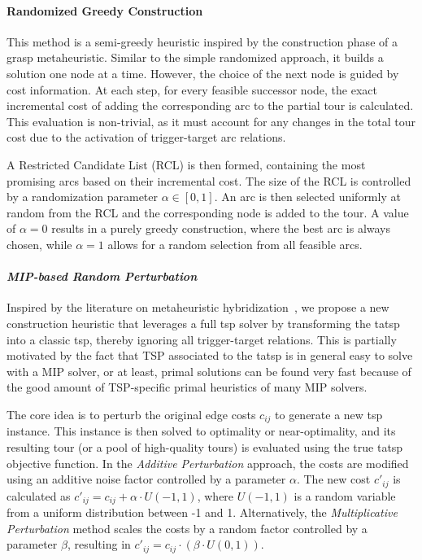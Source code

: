 \documentclass[twocolumn, switch]{article} %
\begin{document}
\paragraph{Randomized Greedy Construction}
This method is a semi-greedy heuristic inspired by the construction phase of a \gls{grasp} metaheuristic. Similar to the simple randomized approach, it builds a solution one node at a time. However, the choice of the next node is guided by cost information. At each step, for every feasible successor node, the exact incremental cost of adding the corresponding arc to the partial tour is calculated. This evaluation is non-trivial, as it must account for any changes in the total tour cost due to the activation of trigger-target arc relations.

A Restricted Candidate List (RCL) is then formed, containing the most promising arcs based on their incremental cost. The size of the RCL is controlled by a randomization parameter $\alpha \in [0, 1]$. An arc is then selected uniformly at random from the RCL and the corresponding node is added to the tour. A value of $\alpha = 0$ results in a purely greedy construction, where the best arc is always chosen, while $\alpha = 1$ allows for a random selection from all feasible arcs.
  
\paragraph{\textit{MIP-based Random Perturbation}}
Inspired by the literature on metaheuristic hybridization~\cite{Blum2016}, we propose a new construction heuristic that leverages a full \gls{tsp} solver by transforming the \gls{tatsp} into a classic \gls{tsp}, thereby ignoring all trigger-target relations.
This is partially motivated by the fact that TSP associated to the \gls{tatsp} is in general easy to solve with a MIP solver, or at least, primal solutions can be found very fast because of the good amount of TSP-specific primal heuristics of many MIP solvers.

The core idea is to perturb the original edge costs $c_{ij}$ to generate a new \gls{tsp} instance.
This instance is then solved to optimality or near-optimality, and its resulting tour (or a pool of high-quality tours) is evaluated using the true \gls{tatsp} objective function.
In the \textit{Additive Perturbation} approach, the costs are modified using an additive noise factor controlled by a parameter $\alpha$. The new cost $c'_{ij}$ is calculated as $c'_{ij} = c_{ij} + \alpha \cdot U(-1, 1)$, where $U(-1, 1)$ is a random variable from a uniform distribution between -1 and 1. Alternatively, the \textit{Multiplicative Perturbation} method scales the costs by a random factor controlled by a parameter $\beta$, resulting in $c'_{ij} = c_{ij} \cdot (\beta \cdot U(0, 1))$.
  
\end{document}
